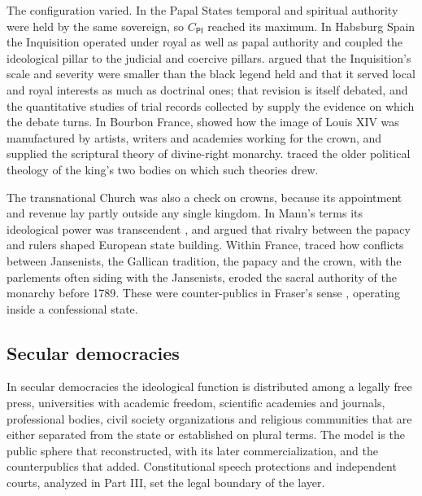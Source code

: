 \documentclass[11pt,letterpaper]{article}
\theoremstyle{definition}
\theoremstyle{remark}
\newcommand{\pP}{\mathsf{P}}
\newcommand{\pI}{\mathsf{I}}
\begin{document}
The configuration varied. In the Papal States temporal and spiritual authority were held by the same sovereign, so $C_{\pP\pI}$ reached its maximum. In Habsburg Spain the Inquisition operated under royal as well as papal authority and coupled the ideological pillar to the judicial and coercive pillars. \citet{kamen1997} argued that the Inquisition's scale and severity were smaller than the black legend held and that it served local and royal interests as much as doctrinal ones; that revision is itself debated, and the quantitative studies of trial records collected by \citet{henningsen1986} supply the evidence on which the debate turns. In Bourbon France, \citet{burke1992} showed how the image of Louis XIV was manufactured by artists, writers and academies working for the crown, and \citet{bossuet1990} supplied the scriptural theory of divine-right monarchy. \citet{kantorowicz1957} traced the older political theology of the king's two bodies on which such theories drew.

The transnational Church was also a check on crowns, because its appointment and revenue lay partly outside any single kingdom. In Mann's terms its ideological power was transcendent \citep{mann1986}, and \citet{grzymala2023} argued that rivalry between the papacy and rulers shaped European state building. Within France, \citet{vankley1996} traced how conflicts between Jansenists, the Gallican tradition, the papacy and the crown, with the parlements often siding with the Jansenists, eroded the sacral authority of the monarchy before 1789. These were counter-publics in Fraser's sense \citep{fraser1990}, operating inside a confessional state.

\subsection{Secular democracies}

In secular democracies the ideological function is distributed among a legally free press, universities with academic freedom, scientific academies and journals, professional bodies, civil society organizations and religious communities that are either separated from the state or established on plural terms. The model is the public sphere that \citet{habermas1989} reconstructed, with its later commercialization, and the counterpublics that \citet{fraser1990} added. Constitutional speech protections and independent courts, analyzed in Part III, set the legal boundary of the layer.
\end{document}
